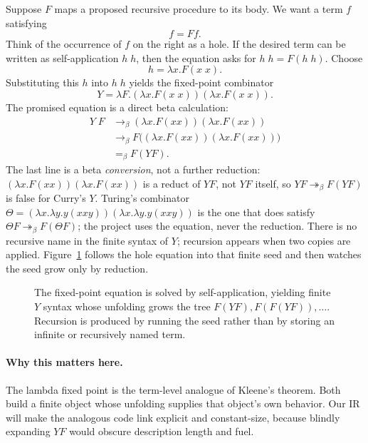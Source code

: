 Suppose \(F\) maps a proposed recursive procedure to its body.  We want a term
\(f\) satisfying
\[
 f=Ff.
\]
Think of the occurrence of \(f\) on the right as a hole.  If the desired term
can be written as self-application \(h\;h\), then the equation asks for
\(h\;h=F(h\;h)\).  Choose
\[
 h=\lambda x.F(x\;x).
\]
Substituting this \(h\) into \(h\;h\) yields the fixed-point combinator
\[
 Y=\lambda F.(\lambda x.F(x\;x))(\lambda x.F(x\;x)).
\]
The promised equation is a direct beta calculation:
\[
\begin{aligned}
 Y\;F
 &\longrightarrow_\beta
 (\lambda x.F(xx))(\lambda x.F(xx))\\
 &\longrightarrow_\beta
 F\bigl((\lambda x.F(xx))(\lambda x.F(xx))\bigr)\\
 &=_\beta F(YF).
\end{aligned}
\]
The last line is a beta \emph{conversion}, not a further reduction:
\((\lambda x.F(xx))(\lambda x.F(xx))\) is a reduct of \(YF\), not \(YF\)
itself, so \(YF\twoheadrightarrow_\beta F(YF)\) is false for Curry's \(Y\).
Turing's combinator
\(\Theta=(\lambda x.\lambda y.y(xxy))(\lambda x.\lambda y.y(xxy))\) is the one
that does satisfy \(\Theta F\twoheadrightarrow_\beta F(\Theta F)\); the project
uses the equation, never the reduction.
There is no recursive name in the finite syntax of \(Y\); recursion appears
when two copies are applied.
Figure~\ref{fig:y-derivation} follows the hole equation into that finite seed
and then watches the seed grow only by reduction.

\begin{figure}[t]
\centering

\caption{The fixed-point equation is solved by self-application, yielding finite $Y$ syntax whose unfolding grows the tree $F(YF),F(F(YF)),\ldots$.  Recursion is produced by running the seed rather than by storing an infinite or recursively named term.}
\label{fig:y-derivation}
\end{figure}

\paragraph{Why this matters here.}
The lambda fixed point is the term-level analogue of Kleene's theorem.  Both
build a finite object whose unfolding supplies that object's own behavior.
Our IR will make the analogous code link explicit and constant-size, because
blindly expanding \(YF\) would obscure description length and fuel.


